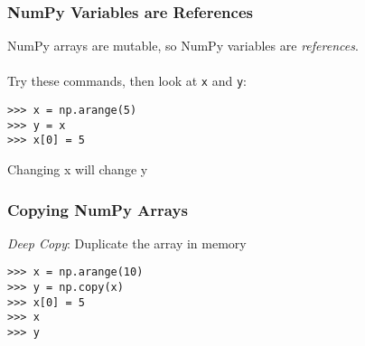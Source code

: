 \begin{frame}[fragile]\frametitle{NumPy Variables are References}

    NumPy arrays are mutable, so NumPy variables are \textit{references}.
    \\~\\
    Try these commands, then look at \lstinline|x| and \lstinline|y|:
    \begin{lstlisting}
>>> x = np.arange(5)
>>> y = x
>>> x[0] = 5
    \end{lstlisting}
    Changing x will change y
\end{frame}

\begin{frame}[fragile]\frametitle{Copying NumPy Arrays}

    \textit{Deep Copy}: Duplicate the array in memory
    \begin{lstlisting}
>>> x = np.arange(10)
>>> y = np.copy(x)
>>> x[0] = 5
>>> x
>>> y
    \end{lstlisting}
\end{frame}

%



%

